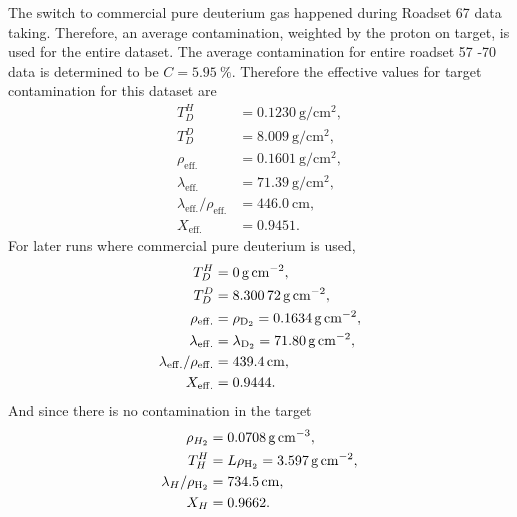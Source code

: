 \documentclass[../main.tex]{subfiles}
\begin{document}
The switch to commercial pure deuterium gas happened during Roadset 67 data taking. Therefore,
an average contamination, weighted by the proton on target, is used for the entire dataset.
The average contamination for entire roadset 57 -70 data is determined to be $C=\SI{5.95}{\percent}$.
Therefore the effective values for target contamination for this dataset are
\begin{equation}
	\begin{split}
		T_D^H                                        & = \SI{0.1230}{\g\per\cm\squared}, \\
		T_D^D                                        & = \SI{8.009}{\g\per\cm\squared},  \\
		\rho_{\mathrm{eff.}}                         & = \SI{0.1601}{\g\per\cm\squared}, \\
		\lambda_{\mathrm{eff.}}                      & = \SI{71.39}{\g\per\cm\squared},  \\
		\lambda_{\mathrm{eff.}}/\rho_{\mathrm{eff.}} & = \SI{446.0}{\cm},                \\
		X_{\mathrm{eff.}}                            & = 0.9451.
	\end{split}
\end{equation}
For later runs where commercial pure deuterium is used,
\begin{equation}
	\begin{split}
		T_D^H                                        & = \SI{0.}{\g\per\cm\squared},                         \\
		T_D^D                                        & = \SI{8.30072}{\g\per\cm\squared},                    \\
		\rho_{\mathrm{eff.}}                         & = \rho_{\ce{D_2}} = \SI{0.1634}{\g\per\cm\squared},   \\
		\lambda_{\mathrm{eff.}}                      & =  \lambda_{\ce{D_2}} =\SI{71.80}{\g\per\cm\squared}, \\
		\lambda_{\mathrm{eff.}}/\rho_{\mathrm{eff.}} & = \SI{439.4}{\cm},                                    \\
		X_{\mathrm{eff.}}                            & = 0.9444.
	\end{split}
\end{equation}
And since there is no contamination in the  target
\begin{equation}
	\begin{split}
		\rho_{H_2}                & = \SI{0.0708}{\g\per\cm\cubed},                     \\
		T_H^H                     & = L\rho_{\ce{H_2}} = \SI{3.597}{\g\per\cm\squared}, \\
		\lambda_H/\rho_{\ce{H_2}} & = \SI{734.5}{\cm},                                  \\
		X_H                       & =0.9662.
	\end{split}
\end{equation}
\end{document}

